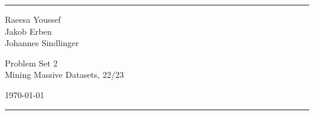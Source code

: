 \documentclass[a4paper]{article}
\begin{document}

\fancyhead[C]{}
\hrule \medskip %
\begin{minipage}{0.295\textwidth} 
\raggedright
\footnotesize
Raeesa Youssef \hfill\\   
Jakob Erben\hfill\\
Johannes Sindlinger
\end{minipage}
\begin{minipage}{0.4\textwidth} 
\centering 
\large 
Problem Set 2\\ 
\normalsize 
Mining Massive Datasets, 22/23\\ 
\end{minipage}
\begin{minipage}{0.295\textwidth} 
\raggedleft
\today\hfill\\
\end{minipage}
\medskip\hrule 
\bigskip









\end{document}

